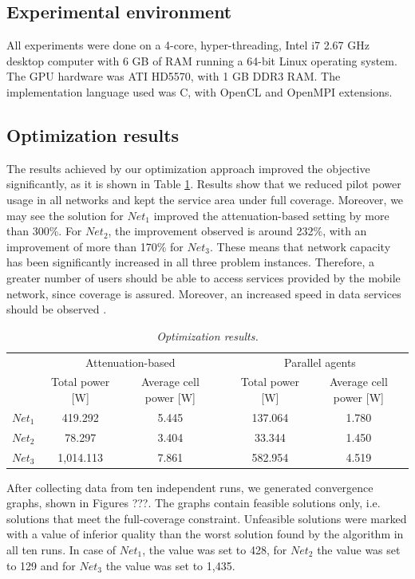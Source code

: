 \subsection{Experimental environment}

All experiments were done on a 4-core, hyper-threading, Intel i7 2.67
GHz desktop computer with 6 GB of RAM running a 64-bit Linux operating
system. The GPU hardware was ATI HD5570, with 1 GB DDR3 RAM. The implementation
language used was C, with OpenCL and OpenMPI extensions.


\subsection{Optimization results}

The results achieved by our optimization approach improved the objective
significantly, as it is shown in Table \ref{tab:optimization-results-2}.
Results show that we reduced pilot power usage in all networks and
kept the service area under full coverage. Moreover, we may see the
solution for $Net_{1}$ improved the attenuation-based setting by
more than 300\%. For $Net_{2}$, the improvement observed is around
232\%, with an improvement of more than 170\% for $Net_{3}$. These
means that network capacity has been significantly increased in all
three problem instances. Therefore, a greater number of users should
be able to access services provided by the mobile network, since coverage
is assured. Moreover, an increased speed in data services should be
observed \cite{Holma_WCDMA.for.UMTS:2005}.

\begin{table}
\caption{\textit{Optimization results.\label{tab:optimization-results-2}}}


\centering

\begin{tabular}{cccccc}
\toprule 
 & \multicolumn{2}{c}{Attenuation-based} &  & \multicolumn{2}{c}{Parallel agents}\tabularnewline\addlinespace
\cmidrule{2-3} \cmidrule{5-6} 
 & Total power {[}W{]} & Average cell power {[}W{]} &  & Total power {[}W{]} & Average cell power {[}W{]}\tabularnewline\addlinespace
\cmidrule{1-3} \cmidrule{5-6} 
$Net_{1}$ & 419.292 & 5.445 &  & 137.064 & 1.780\tabularnewline
$Net_{2}$ & 78.297 & 3.404 &  & 33.344 & 1.450\tabularnewline
$Net_{3}$ & 1,014.113 & 7.861 &  & 582.954 & 4.519\tabularnewline
\bottomrule
\end{tabular}
\end{table}


After collecting data from ten independent runs, we generated convergence
graphs, shown in Figures ???. The graphs contain feasible solutions
only, i.e. solutions that meet the full-coverage constraint. Unfeasible
solutions were marked with a value of inferior quality than the worst
solution found by the algorithm in all ten runs. In case of $Net_{1}$,
the value was set to 428, for $Net_{2}$ the value was set to 129
and for $Net_{3}$ the value was set to 1,435. 

